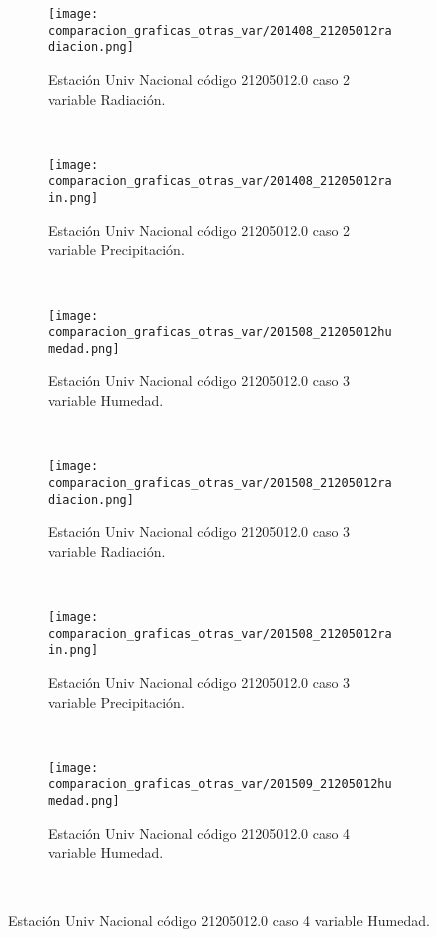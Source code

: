 \begin{figure}[H]
\centering
\begin{subfigure}[normla]{0.4\textwidth}
\caption{Estación Univ Nacional código 21205012.0 caso 2 variable Radiación.}
\texttt{[image: comparacion\_graficas\_otras\_var/201408\_21205012radiacion.png]}
\end{subfigure}
~
\begin{subfigure}[normla]{0.4\textwidth}
\caption{Estación Univ Nacional código 21205012.0 caso 2 variable Precipitación.}
\texttt{[image: comparacion\_graficas\_otras\_var/201408\_21205012rain.png]}
\end{subfigure}
~
\begin{subfigure}[normla]{0.4\textwidth}
\caption{Estación Univ Nacional código 21205012.0 caso 3 variable Humedad.}
\texttt{[image: comparacion\_graficas\_otras\_var/201508\_21205012humedad.png]}
\end{subfigure}
~
\begin{subfigure}[normla]{0.4\textwidth}
\caption{Estación Univ Nacional código 21205012.0 caso 3 variable Radiación.}
\texttt{[image: comparacion\_graficas\_otras\_var/201508\_21205012radiacion.png]}
\end{subfigure}
~
\begin{subfigure}[normla]{0.4\textwidth}
\caption{Estación Univ Nacional código 21205012.0 caso 3 variable Precipitación.}
\texttt{[image: comparacion\_graficas\_otras\_var/201508\_21205012rain.png]}
\end{subfigure}
~
\begin{subfigure}[normla]{0.4\textwidth}
\caption{Estación Univ Nacional código 21205012.0 caso 4 variable Humedad.}
\texttt{[image: comparacion\_graficas\_otras\_var/201509\_21205012humedad.png]}
\end{subfigure}
~
\end{figure}
           
